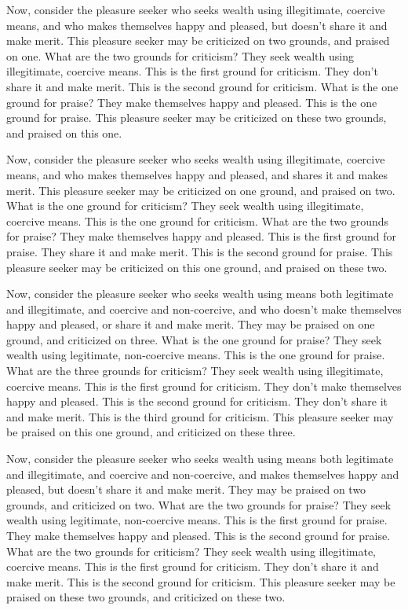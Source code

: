 \documentclass[12pt,openany]{book}%
\begin{document}
Now, consider the pleasure seeker who seeks wealth using illegitimate, coercive means, and who makes themselves happy and pleased, but doesn’t share it and make merit. This pleasure seeker may be criticized on two grounds, and praised on one. What are the two grounds for criticism? They seek wealth using illegitimate, coercive means. This is the first ground for criticism. They don’t share it and make merit. This is the second ground for criticism. What is the one ground for praise? They make themselves happy and pleased. This is the one ground for praise. This pleasure seeker may be criticized on these two grounds, and praised on this one. 

Now, consider the pleasure seeker who seeks wealth using illegitimate, coercive means, and who makes themselves happy and pleased, and shares it and makes merit. This pleasure seeker may be criticized on one ground, and praised on two. What is the one ground for criticism? They seek wealth using illegitimate, coercive means. This is the one ground for criticism. What are the two grounds for praise? They make themselves happy and pleased. This is the first ground for praise. They share it and make merit. This is the second ground for praise. This pleasure seeker may be criticized on this one ground, and praised on these two. 

Now, consider the pleasure seeker who seeks wealth using means both legitimate and illegitimate, and coercive and non-coercive, and who doesn’t make themselves happy and pleased, or share it and make merit. They may be praised on one ground, and criticized on three. What is the one ground for praise? They seek wealth using legitimate, non-coercive means. This is the one ground for praise. What are the three grounds for criticism? They seek wealth using illegitimate, coercive means. This is the first ground for criticism. They don’t make themselves happy and pleased. This is the second ground for criticism. They don’t share it and make merit. This is the third ground for criticism. This pleasure seeker may be praised on this one ground, and criticized on these three. 

Now, consider the pleasure seeker who seeks wealth using means both legitimate and illegitimate, and coercive and non-coercive, and makes themselves happy and pleased, but doesn’t share it and make merit. They may be praised on two grounds, and criticized on two. What are the two grounds for praise? They seek wealth using legitimate, non-coercive means. This is the first ground for praise. They make themselves happy and pleased. This is the second ground for praise. What are the two grounds for criticism? They seek wealth using illegitimate, coercive means. This is the first ground for criticism. They don’t share it and make merit. This is the second ground for criticism. This pleasure seeker may be praised on these two grounds, and criticized on these two. 
\end{document}

